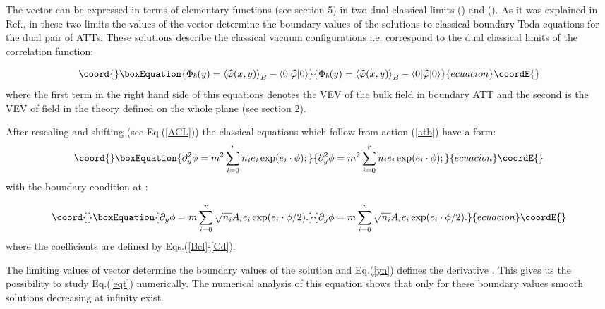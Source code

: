 \documentclass[a4paper,12pt,titlepage,final]{article}
\begin{document}
The vector \coordHE{} can be expressed in terms of elementary 
functions (see
section 5) in two dual classical limits \coordHE{} (\coordHE{}) and
\coordHE{} (\coordHE{}).
As it was explained in Ref.\cite{FO}, in these
two limits the values of the vector \coordHE{} determine the boundary 
values
\coordHE{} of the solutions \coordHE{} to classical boundary Toda equations
for the dual pair of ATTs. These solutions describe the classical vacuum
configurations i.e. correspond to the dual classical limits of the
correlation function:

\begin{equation}\coord{}\boxEquation{
\Phi _{b}(y)=\left\langle \widehat{\varphi }(x,y)\right\rangle
_{B}-\left\langle 0|\widehat{\varphi }|0\right\rangle   \label{FI}
}{
\Phi _{b}(y)=\left\langle \widehat{\varphi }(x,y)\right\rangle
_{B}-\left\langle 0|\widehat{\varphi }|0\right\rangle   }{ecuacion}\coordE{}\end{equation}
where the first term in the right hand side of this equations denotes the
VEV of the bulk field in boundary ATT and the second is the VEV of field
\myHighlight{$\widehat{\varphi }$}\coordHE{} in the theory defined on the whole plane (see 
section 2).

After rescaling and shifting (see Eq.(\ref{ACL})) the classical equations
which follow from action (\ref{atb}) have a form:
\begin{equation}\coord{}\boxEquation{
\partial _{y}^{2}\phi =m^{2}\sum_{i=0}^{r}n_{i}e_{i}\exp (e_{i}\cdot \phi );
\label{eqt}
}{
\partial _{y}^{2}\phi =m^{2}\sum_{i=0}^{r}n_{i}e_{i}\exp (e_{i}\cdot \phi );
}{ecuacion}\coordE{}\end{equation}
with the boundary condition at \coordHE{}:

\begin{equation}\coord{}\boxEquation{
\partial _{y}\phi =m\sum\limits_{i=0}^{r}\sqrt{n_{i}}A_{i}e_{i}\exp
(e_{i}\cdot \phi /2).  \label{yn}
}{
\partial _{y}\phi =m\sum\limits_{i=0}^{r}\sqrt{n_{i}}A_{i}e_{i}\exp
(e_{i}\cdot \phi /2).  }{ecuacion}\coordE{}\end{equation}
where the coefficients \coordHE{} are defined by Eqs.(\ref{Bcl}-\ref{Cd}).

The limiting values of vector \coordHE{} determine the boundary
values \coordHE{} of the solution and Eq.(\ref{yn}) defines the
derivative \coordHE{}.  This gives us the possibility to
study Eq.(\ref{eqt}) numerically. The numerical analysis of this
equation shows that only for these boundary values smooth solutions
decreasing at infinity exist.
\end{document}
